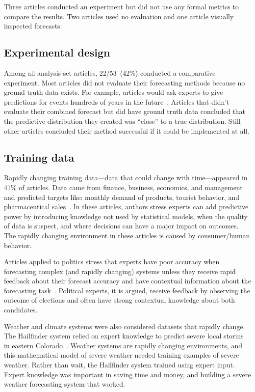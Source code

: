 \documentclass[preprint,authoryear]{elsarticle}
\begin{document}
Three articles conducted an experiment but did not use any formal metrics to compare the results.
Two articles used no evaluation and one article visually inspected forecasts.

\subsection{Experimental design}

Among all analysis-set articles, 22/53~(42\%) conducted a comparative experiment.
Most articles did not evaluate their forecasting methods because no ground truth data exists.
For example, articles would ask experts to give predictions for events hundreds of years in the future~\citep{zio1997accounting,zio1996use}.
Articles that didn't evaluate their combined forecast but did have ground truth data concluded that the predictive distribution they created was ``close'' to a true distribution.
Still other articles concluded their method successful if it could be implemented at all.

\subsection{Training data}
Rapidly changing training data---data that could change with time---appeared in 41\% of articles.
Data came from finance, business, economics, and management and predicted targets like: monthly demand of products, tourist behavior, and pharmaceutical sales~\citep{baecke2017investigating,petrovic2006fuzzy,wang2008probabilistic,klas2010support,franses2011averaging}.
In these articles, authors stress experts can add predictive power by introducing knowledge not used by statistical models, when the quality of data is suspect, and where decisions can have a major impact on outcomes. 
The rapidly changing environment in these articles is caused by consumer/human behavior.

Articles applied to politics stress that experts have poor accuracy when forecasting complex (and rapidly changing) systems unless they receive rapid feedback about their forecast accuracy and have contextual information about the forecasting task~\citep{graefe2014accuracy,graefe2015accuracy,graefe2018predicting,satopaa2014probability}.
Political experts, it is argued, receive feedback by observing the outcome of elections and often have strong contextual knowledge about both candidates.  

Weather and climate systems were also considered datasets that rapidly change.
The Hailfinder system relied on expert knowledge to predict severe local storms in eastern Colorado~\citep{abramson1996hailfinder}.
Weather systems are rapidly changing environments, and this mathematical model of severe weather needed training examples of severe weather.
Rather than wait, the Hailfinder system trained using expert input.
Expert knowledge was important in saving time and money, and building a severe weather forecasting system that worked.
\end{document}
